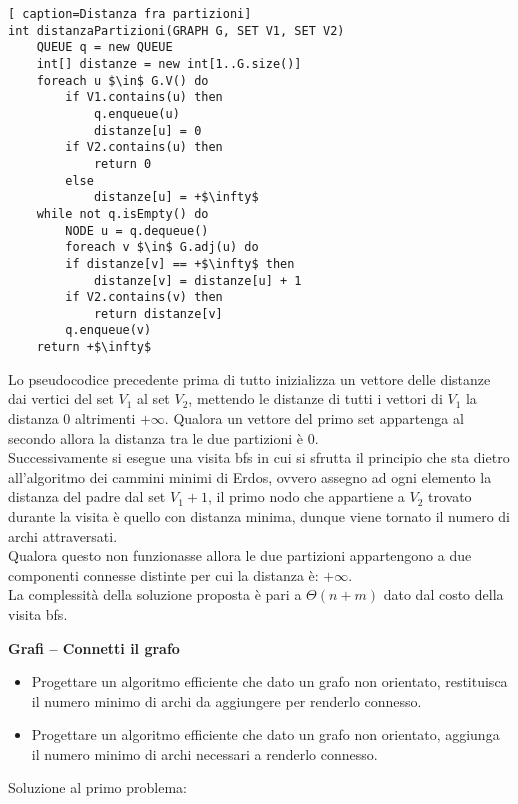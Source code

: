 \documentclass[../cheatSheetAlgoritmi.tex]{subfiles}
\begin{document}
 
\begin{lstlisting}[ caption=Distanza fra partizioni]
int distanzaPartizioni(GRAPH G, SET V1, SET V2)
	QUEUE q = new QUEUE
  	int[] distanze = new int[1..G.size()]
  	foreach u $\in$ G.V() do
    	if V1.contains(u) then
      		q.enqueue(u)
      		distanze[u] = 0
      	if V2.contains(u) then
        	return 0
    	else
      		distanze[u] = +$\infty$
 	while not q.isEmpty() do
    	NODE u = q.dequeue()
    	foreach v $\in$ G.adj(u) do
    	if distanze[v] == +$\infty$ then
      		distanze[v] = distanze[u] + 1
      	if V2.contains(v) then
        	return distanze[v]
      	q.enqueue(v)
  	return +$\infty$
\end{lstlisting}
Lo pseudocodice precedente prima di tutto inizializza un vettore delle distanze dai vertici del set $V_1$ al set $V_2$, mettendo le distanze di tutti i vettori di $V_1$ la distanza 0 altrimenti $+\infty$. Qualora un vettore del primo set appartenga al secondo allora la distanza tra le due partizioni è 0. \\
Successivamente si esegue una visita bfs in cui si sfrutta il principio che sta dietro all'algoritmo dei cammini minimi di Erdos, ovvero assegno ad ogni elemento la distanza del padre dal set $V_1 + 1$, il primo nodo che appartiene a $V_2$ trovato durante la visita è quello con distanza minima, dunque viene tornato il numero di archi attraversati. \\
Qualora questo non funzionasse allora le due partizioni appartengono a due componenti connesse distinte per cui la distanza è: $+\infty$. \\
La complessità della soluzione proposta è pari a $\Theta(n + m)$ dato dal costo della visita bfs.

\bigskip
\textbf{Grafi – Connetti il grafo}

\begin{itemize}
	\item Progettare un algoritmo efficiente che dato un grafo non orientato, restituisca il numero minimo di archi da aggiungere per renderlo connesso.
	\item Progettare un algoritmo efficiente che dato un grafo non orientato, aggiunga il numero minimo di archi necessari a renderlo connesso.
\end{itemize}

Soluzione al primo problema:
 
\end{document}
